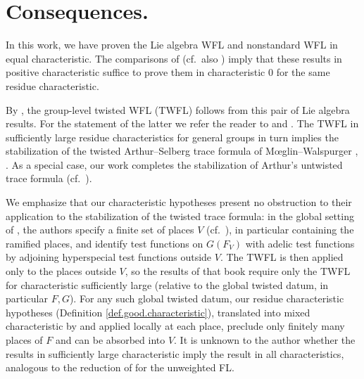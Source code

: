 \documentclass[openany]{amsbook}
\theoremstyle{definition}
\theoremstyle{remark}
\numberwithin{equation}{section}
\renewcommand{\-}{\operatorname{-}}
\begin{document}
\section{Consequences.}\label{subsect.consequences}

In this work, we have proven the Lie algebra WFL and nonstandard WFL in equal characteristic. The comparisons of \cite[\S 7.3, 8.7]{waldchangeofchar} (cf.\ also \cite{cluckerstransferwfl}) imply that these results in positive characteristic suffice to prove them in characteristic 0 for the same residue characteristic. 

By \cite[Th\'eor\`eme 3.8]{WaldTordu}, the group-level twisted WFL (TWFL) follows from this pair of Lie algebra results. For the statement of the latter we refer the reader to \cite[Conjecture 3.5]{WaldTordu} and \cite[\S II.4.4]{MWStabI}. The TWFL in sufficiently large residue characteristics for general groups in turn implies the stabilization of the twisted Arthur--Selberg trace formula of M{\oe}glin--Walspurger \cite{MWStabI}, \cite{MWStabII}. As a special case, our work completes the stabilization of Arthur's untwisted trace formula (cf.\ \cite{ArthurStableI, ArthurStableII, ArthurStableIII}). 

We emphasize that our characteristic hypotheses present no obstruction to their application to the stabilization of the twisted trace formula: in the global setting of \cite[\S X]{MWStabII}, the authors specify a finite set of places $V$ (cf.\ \cite[p.\ 592-593, p.\ 1145]{MWStabII}), in particular containing the ramified places, and identify test functions on $G(F_V)$ with adelic test functions by adjoining hyperspecial test functions outside $V$. The TWFL is then applied only to the places outside $V$, so the results of that book require only the TWFL for characteristic sufficiently large (relative to the global twisted datum, in particular $F, G$). For any such global twisted datum, our residue characteristic hypotheses (Definition \ref{def.good.characteristic}), translated into mixed characteristic by \cite{waldchangeofchar} and applied locally at each place, preclude only finitely many places of $F$ and can be absorbed into $V$. It is unknown to the author whether the results in sufficiently large characteristic imply the result in all characteristics, analogous to the reduction of \cite{halesflredgoodchar} for the unweighted FL.
\end{document}
